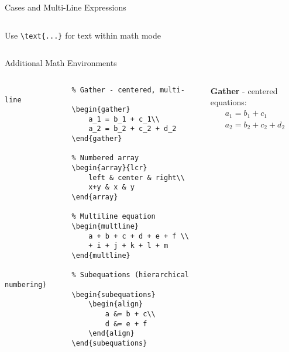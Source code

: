 \begin{frame}[fragile]{Cases and Multi-Line Expressions}
\begin{columns}
\begin{column}{0.5\textwidth}
            \begin{tip}
                Use \texttt{\textbackslash text\{...\}} for text within math mode
            \end{tip}
        \end{column}
    \end{columns}
\end{frame}

\begin{frame}[fragile]{Additional Math Environments}
    \begin{columns}
        \begin{column}{0.5\textwidth}
            \begin{lstlisting}
                % Gather - centered, multi-line
                \begin{gather}
                    a_1 = b_1 + c_1\\
                    a_2 = b_2 + c_2 + d_2
                \end{gather}
                
                % Numbered array
                \begin{array}{lcr}
                    left & center & right\\
                    x+y & x & y
                \end{array}
                
                % Multiline equation
                \begin{multline}
                    a + b + c + d + e + f \\
                    + i + j + k + l + m
                \end{multline}
                
                % Subequations (hierarchical numbering)
                \begin{subequations}
                    \begin{align}
                        a &= b + c\\
                        d &= e + f
                    \end{align}
                \end{subequations}
            \end{lstlisting}
        \end{column}
        
        \begin{column}{0.5\textwidth}
            \textbf{Gather} - centered equations:
            \begin{gather}
                a_1 = b_1 + c_1\\
                a_2 = b_2 + c_2 + d_2
            \end{gather}
            

\end{column}
\end{columns}
\end{frame}
